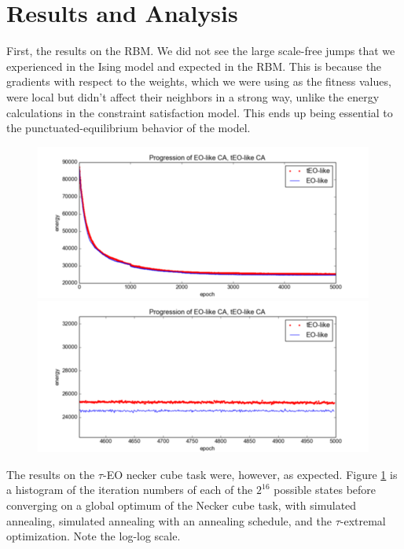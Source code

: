 \documentclass[12pt]{article}
\begin{document}
\section{Results and Analysis}
First, the results on the RBM. We did not see the large scale-free jumps that we experienced in the Ising model and expected in the RBM. This is because the gradients with respect to the weights, which we were using as the fitness values, were local but didn't affect their neighbors in a strong way, unlike the energy calculations in the constraint satisfaction model. This ends up being essential to the punctuated-equilibrium behavior of the model.

\begin{figure}
  \includegraphics{eo_rbm_unzoomed}
  \includegraphics{eo_rbm_zoomed}
\end{figure}

The results on the $\tau$-EO necker cube task were, however, as expected. Figure \ref{fig:speed} is a histogram of the iteration numbers of each of the $2^16$ possible states before converging on a global optimum of the Necker cube task, with simulated annealing, simulated annealing with an annealing schedule, and the $\tau$-extremal optimization. Note the log-log scale.

\begin{figure}
  \label{fig:speed}
\end{figure}
\end{document}
